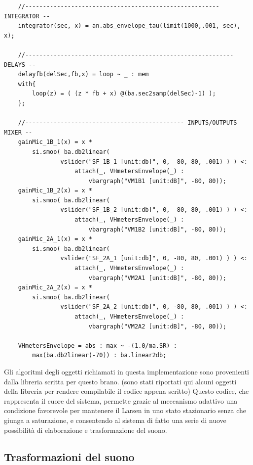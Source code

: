 \begin{lstlisting}
    //------------------------------------------------------- INTEGRATOR --
    integrator(sec, x) = an.abs_envelope_tau(limit(1000,.001, sec), x);
    
    //----------------------------------------------------------- DELAYS --
    delayfb(delSec,fb,x) = loop ~ _ : mem
    with{ 
        loop(z) = ( (z * fb + x) @(ba.sec2samp(delSec)-1) );
    };
    
    //--------------------------------------------- INPUTS/OUTPUTS MIXER --
    gainMic_1B_1(x) = x *    
        si.smoo( ba.db2linear(
                vslider("SF_1B_1 [unit:db]", 0, -80, 80, .001) ) ) <:
                    attach(_, VHmetersEnvelope(_) :
                        vbargraph("VM1B1 [unit:dB]", -80, 80));
    gainMic_1B_2(x) = x * 
        si.smoo( ba.db2linear(
                vslider("SF_1B_2 [unit:db]", 0, -80, 80, .001) ) ) <:
                    attach(_, VHmetersEnvelope(_) :
                        vbargraph("VM1B2 [unit:dB]", -80, 80));
    gainMic_2A_1(x) = x * 
        si.smoo( ba.db2linear(
                vslider("SF_2A_1 [unit:db]", 0, -80, 80, .001) ) ) <:
                    attach(_, VHmetersEnvelope(_) :
                        vbargraph("VM2A1 [unit:dB]", -80, 80));
    gainMic_2A_2(x) = x * 
        si.smoo( ba.db2linear(
                vslider("SF_2A_2 [unit:db]", 0, -80, 80, .001) ) ) <:
                    attach(_, VHmetersEnvelope(_) :
                        vbargraph("VM2A2 [unit:dB]", -80, 80));
    
    VHmetersEnvelope = abs : max ~ -(1.0/ma.SR) : 
        max(ba.db2linear(-70)) : ba.linear2db;
\end{lstlisting}

Gli algoritmi degli oggetti richiamati in questa implementazione sono 
provenienti dalla libreria scritta per questo brano.
(sono stati riportati qui alcuni oggetti della libreria per rendere compilabile
il codice appena scritto)
Questo codice, che rappresenta il cuore del sistema,
permette grazie al meccanismo adattivo una condizione favorevole
per mantenere il Larsen in uno stato stazionario senza che giunga a 
saturazione, e consentendo al sistema
di fatto una serie di nuove possibilità di elaborazione e trasformazione del suono.

\subsection{Trasformazioni del suono}
\label{sec:Trasformazioni del suono}

